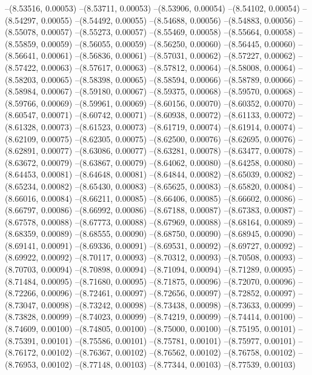 --(8.53516, 0.00053)
--(8.53711, 0.00053)
--(8.53906, 0.00054)
--(8.54102, 0.00054)
--(8.54297, 0.00055)
--(8.54492, 0.00055)
--(8.54688, 0.00056)
--(8.54883, 0.00056)
--(8.55078, 0.00057)
--(8.55273, 0.00057)
--(8.55469, 0.00058)
--(8.55664, 0.00058)
--(8.55859, 0.00059)
--(8.56055, 0.00059)
--(8.56250, 0.00060)
--(8.56445, 0.00060)
--(8.56641, 0.00061)
--(8.56836, 0.00061)
--(8.57031, 0.00062)
--(8.57227, 0.00062)
--(8.57422, 0.00063)
--(8.57617, 0.00063)
--(8.57812, 0.00064)
--(8.58008, 0.00064)
--(8.58203, 0.00065)
--(8.58398, 0.00065)
--(8.58594, 0.00066)
--(8.58789, 0.00066)
--(8.58984, 0.00067)
--(8.59180, 0.00067)
--(8.59375, 0.00068)
--(8.59570, 0.00068)
--(8.59766, 0.00069)
--(8.59961, 0.00069)
--(8.60156, 0.00070)
--(8.60352, 0.00070)
--(8.60547, 0.00071)
--(8.60742, 0.00071)
--(8.60938, 0.00072)
--(8.61133, 0.00072)
--(8.61328, 0.00073)
--(8.61523, 0.00073)
--(8.61719, 0.00074)
--(8.61914, 0.00074)
--(8.62109, 0.00075)
--(8.62305, 0.00075)
--(8.62500, 0.00076)
--(8.62695, 0.00076)
--(8.62891, 0.00077)
--(8.63086, 0.00077)
--(8.63281, 0.00078)
--(8.63477, 0.00078)
--(8.63672, 0.00079)
--(8.63867, 0.00079)
--(8.64062, 0.00080)
--(8.64258, 0.00080)
--(8.64453, 0.00081)
--(8.64648, 0.00081)
--(8.64844, 0.00082)
--(8.65039, 0.00082)
--(8.65234, 0.00082)
--(8.65430, 0.00083)
--(8.65625, 0.00083)
--(8.65820, 0.00084)
--(8.66016, 0.00084)
--(8.66211, 0.00085)
--(8.66406, 0.00085)
--(8.66602, 0.00086)
--(8.66797, 0.00086)
--(8.66992, 0.00086)
--(8.67188, 0.00087)
--(8.67383, 0.00087)
--(8.67578, 0.00088)
--(8.67773, 0.00088)
--(8.67969, 0.00088)
--(8.68164, 0.00089)
--(8.68359, 0.00089)
--(8.68555, 0.00090)
--(8.68750, 0.00090)
--(8.68945, 0.00090)
--(8.69141, 0.00091)
--(8.69336, 0.00091)
--(8.69531, 0.00092)
--(8.69727, 0.00092)
--(8.69922, 0.00092)
--(8.70117, 0.00093)
--(8.70312, 0.00093)
--(8.70508, 0.00093)
--(8.70703, 0.00094)
--(8.70898, 0.00094)
--(8.71094, 0.00094)
--(8.71289, 0.00095)
--(8.71484, 0.00095)
--(8.71680, 0.00095)
--(8.71875, 0.00096)
--(8.72070, 0.00096)
--(8.72266, 0.00096)
--(8.72461, 0.00097)
--(8.72656, 0.00097)
--(8.72852, 0.00097)
--(8.73047, 0.00098)
--(8.73242, 0.00098)
--(8.73438, 0.00098)
--(8.73633, 0.00099)
--(8.73828, 0.00099)
--(8.74023, 0.00099)
--(8.74219, 0.00099)
--(8.74414, 0.00100)
--(8.74609, 0.00100)
--(8.74805, 0.00100)
--(8.75000, 0.00100)
--(8.75195, 0.00101)
--(8.75391, 0.00101)
--(8.75586, 0.00101)
--(8.75781, 0.00101)
--(8.75977, 0.00101)
--(8.76172, 0.00102)
--(8.76367, 0.00102)
--(8.76562, 0.00102)
--(8.76758, 0.00102)
--(8.76953, 0.00102)
--(8.77148, 0.00103)
--(8.77344, 0.00103)
--(8.77539, 0.00103)
